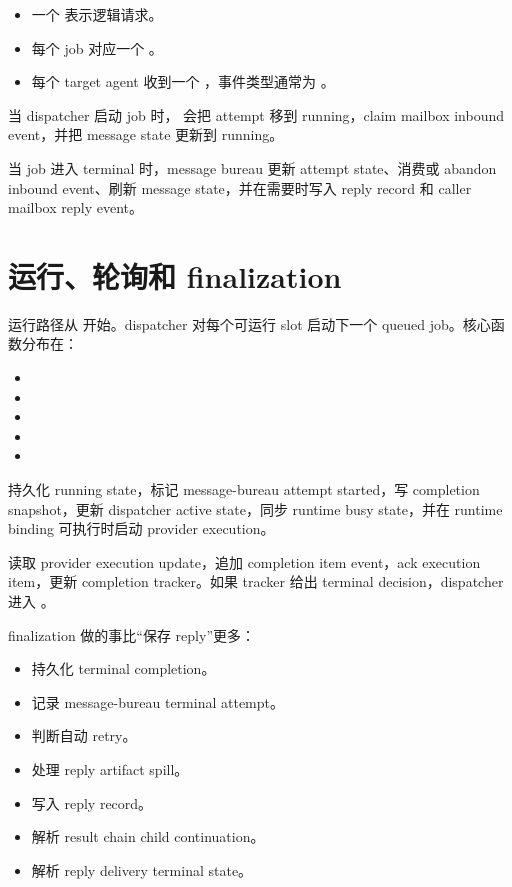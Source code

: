 \begin{itemize}
  \item 一个  表示逻辑请求。
  \item 每个 job 对应一个 。
  \item 每个 target agent 收到一个 ，事件类型通常为 。
\end{itemize}

当 dispatcher 启动 job 时， 会把 attempt 移到 running，claim mailbox inbound event，并把 message state 更新到 running。

当 job 进入 terminal 时，message bureau 更新 attempt state、消费或 abandon inbound event、刷新 message state，并在需要时写入 reply record 和 caller mailbox reply event。

\section{运行、轮询和 finalization}

运行路径从  开始。dispatcher 对每个可运行 slot 启动下一个 queued job。核心函数分布在：

\begin{itemize}
  \item {}
  \item {}
  \item {}
  \item {}
  \item {}
\end{itemize}

 持久化 running state，标记 message-bureau attempt started，写 completion snapshot，更新 dispatcher active state，同步 runtime busy state，并在 runtime binding 可执行时启动 provider execution。

 读取 provider execution update，追加 completion item event，ack execution item，更新 completion tracker。如果 tracker 给出 terminal decision，dispatcher 进入 。

finalization 做的事比“保存 reply”更多：

\begin{itemize}
  \item 持久化 terminal completion。
  \item 记录 message-bureau terminal attempt。
  \item 判断自动 retry。
  \item 处理 reply artifact spill。
  \item 写入 reply record。
  \item 解析 result chain child continuation。
  \item 解析 reply delivery terminal state。
\end{itemize}

